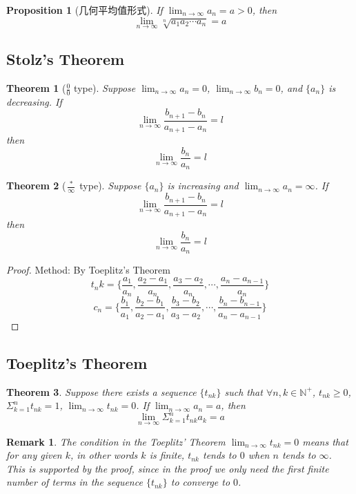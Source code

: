 \documentclass[onecolumn]{ctexart}
\newtheorem{theorem}{Theorem}
\newtheorem{proposition}{Proposition}
\newtheorem{remark}{Remark}
\begin{document}
\begin{proposition}[几何平均值形式]
  If $\lim_{n \to \infty} a_n = a > 0$, then
  \[
    \lim_{n \to \infty} \sqrt[n]{a_1 a_2 \cdots a_n} = a
  \]
\end{proposition}


\subsection{Stolz's Theorem}

\begin{theorem}[$\frac{0}{0}$ type]
  Suppose $\lim_{n \to \infty} a_n = 0$, $\lim_{n \to \infty} b_n = 0$, and 
  $\{a_n\}$ is decreasing. If 
  \[
    \lim_{n \to \infty} \frac{b_{n+1} - b_n}{a_{n+1} - a_n} = l
  \]
  then 
  \[
    \lim_{n \to \infty} \frac{b_n}{a_n} = l
  \]
\end{theorem}

\begin{theorem}[$\frac{*}{\infty}$ type]
  Suppose $\{a_n\}$ is increasing and $\lim_{n \to \infty} a_n = \infty$. If
  \[
    \lim_{n \to \infty} \frac{b_{n+1} - b_n}{a_{n+1} - a_n} = l
  \]
  then
  \[
    \lim_{n \to \infty} \frac{b_n}{a_n} = l   
  \]
\end{theorem}

\begin{proof}
  Method: By Toeplitz's Theorem
  \[
    t_nk = \{\frac{a_1}{a_n}, \frac{a_2 - a_1}{a_n}, \frac{a_3 - a_2}{a_n}, \cdots, \frac{a_n - a_{n-1}}{a_n}\}
  \]
  \[
    c_n = \{\frac{b_1}{a_1}, \frac{b_2 - b_1}{a_2 - a_1}, \frac{b_3 - b_2}{a_3 - a_2}, \cdots, \frac{b_n - b_{n-1}}{a_n - a_{n-1}}\}
  \]
\end{proof}

\subsection{Toeplitz's Theorem}

\begin{theorem}
  Suppose there exists a sequence $\{t_{nk}\}$ such that 
  $\forall n, k \in \mathbb{N^+}$, $t_{nk} \geq 0$, $\Sigma_{k=1}^n t_{nk} = 1$, 
  $\lim_{n \to \infty} t_{nk} = 0$. If $\lim_{n \to \infty} a_n = a$, then 
  \[
    \lim_{n \to \infty} \Sigma_{k=1}^n t_{nk} a_k = a
  \]
\end{theorem}

\begin{remark}
  The condition in the Toeplitz' Theorem $\lim_{n \to \infty} t_{nk} = 0$ means 
  that for any given $k$, in other words $k$ is finite, $t_{nk}$ tends to $0$ 
  when $n$ tends to $\infty$. This is supported by the proof, since in the proof 
  we only need the first finite number of terms in the sequence $\{t_{nk}\}$ to 
  converge to $0$.
\end{remark}
\end{document}

